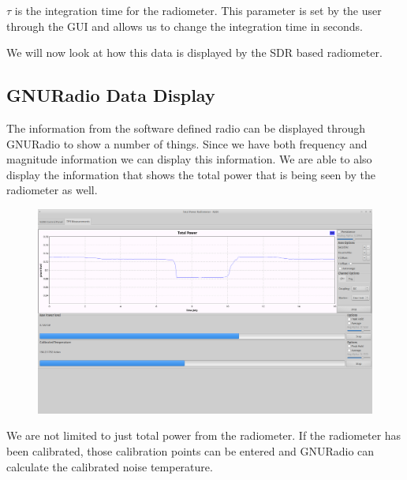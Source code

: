$\tau$ is the integration time for the radiometer.  This parameter is set by the user through the GUI and allows us to change the integration time in seconds.

We will now look at how this data is displayed by the SDR based radiometer.

\subsection{GNURadio Data Display}
The information from the software defined radio can be displayed through GNURadio to show a number of things.  Since we have both frequency and magnitude information we can display this information.  We are able to also display the information that shows the total power that is being seen by the radiometer as well.

{\begin{figure}[h!tb] 
\centering
\includegraphics[width=17cm]{Images/Lab1_TPR_at_end_exp.png}
\label{radiometer_tpr_display}
\end{figure}
}

We are not limited to just total power from the radiometer.  If the radiometer has been calibrated, those calibration points can be entered and GNURadio can calculate the calibrated noise temperature.  


